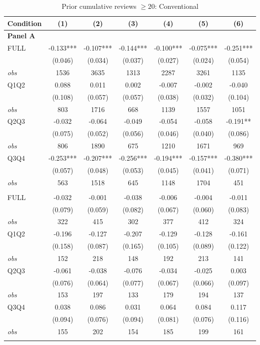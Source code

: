 \begin{table}[!htbp]
\centering
\caption{Prior cumulative reviews $\geq20$: Conventional}
\begin{tabular}{lcccccc}
\toprule
Condition & (1) & (2) & (3) & (4) & (5) & (6) \\
\midrule
\multicolumn{7}{l}{\textbf{Panel A}} \\

FULL & -0.133*** & -0.107*** & -0.144*** & -0.100*** & -0.075*** & -0.251*** \\
 & (0.046) & (0.034) & (0.037) & (0.027) & (0.024) & (0.054) \\
\textit{obs} & 1536 & 3635 & 1313 & 2287 & 3261 & 1135 \\
Q1Q2 & 0.088 & 0.011 & 0.002 & -0.007 & -0.002 & -0.040 \\
 & (0.108) & (0.057) & (0.057) & (0.038) & (0.032) & (0.104) \\
\textit{obs} & 803 & 1716 & 668 & 1139 & 1557 & 1051 \\
Q2Q3 & -0.032 & -0.064 & -0.049 & -0.054 & -0.058 & -0.191** \\
 & (0.075) & (0.052) & (0.056) & (0.046) & (0.040) & (0.086) \\
\textit{obs} & 806 & 1890 & 675 & 1210 & 1671 & 969 \\
Q3Q4 & -0.253*** & -0.207*** & -0.256*** & -0.194*** & -0.157*** & -0.380*** \\
 & (0.057) & (0.048) & (0.053) & (0.045) & (0.041) & (0.071) \\
\textit{obs} & 563 & 1518 & 645 & 1148 & 1704 & 451 \\
\addlinespace
\multicolumn{7}{l}{\textbf{Panel B}} \\

FULL & -0.032 & -0.001 & -0.038 & -0.006 & -0.004 & -0.011 \\
 & (0.079) & (0.059) & (0.082) & (0.067) & (0.060) & (0.083) \\
\textit{obs} & 322 & 415 & 302 & 377 & 412 & 324 \\
Q1Q2 & -0.196 & -0.127 & -0.207 & -0.129 & -0.128 & -0.161 \\
 & (0.158) & (0.087) & (0.165) & (0.105) & (0.089) & (0.122) \\
\textit{obs} & 152 & 218 & 148 & 192 & 213 & 141 \\
Q2Q3 & -0.061 & -0.038 & -0.076 & -0.034 & -0.025 & 0.003 \\
 & (0.076) & (0.064) & (0.077) & (0.067) & (0.066) & (0.097) \\
\textit{obs} & 153 & 197 & 133 & 179 & 194 & 137 \\
Q3Q4 & 0.038 & 0.086 & 0.031 & 0.064 & 0.084 & 0.117 \\
 & (0.094) & (0.076) & (0.094) & (0.081) & (0.076) & (0.116) \\
\textit{obs} & 155 & 202 & 154 & 185 & 199 & 161 \\
\addlinespace
\multicolumn{7}{l}{\textbf{Panel C}} \\


\end{tabular}
\end{table}
